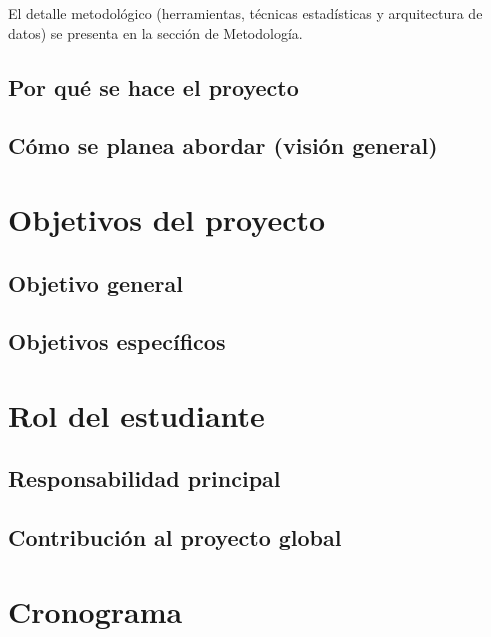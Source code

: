 El detalle metodológico (herramientas, técnicas estadísticas y arquitectura de datos) se presenta en la sección de Metodología.

\subsection{Por qué se hace el proyecto}
\subsection{Cómo se planea abordar (visión general)}

\section{Objetivos del proyecto}
\subsection{Objetivo general}
\subsection{Objetivos específicos}

\section{Rol del estudiante}
\subsection{Responsabilidad principal}
\subsection{Contribución al proyecto global}

\section{Cronograma}
